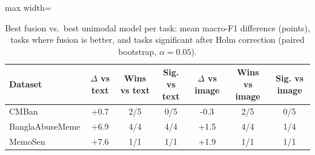 \begin{table}[t]
\centering
\small
\caption{Best fusion vs.\ best unimodal model per task: mean macro-F1 difference (points), tasks where fusion is better, and tasks significant after Holm correction (paired bootstrap, $\alpha=0.05$).}
\label{tab:cross_sig}
\begin{adjustbox}{max width=\columnwidth}
\begin{tabular}{lcccccc}
\toprule
Dataset & $\Delta$ vs text & Wins vs text & Sig. vs text & $\Delta$ vs image & Wins vs image & Sig. vs image \\
\midrule
CMBan & +0.7 & 2/5 & 0/5 & -0.3 & 2/5 & 0/5 \\
BanglaAbuseMeme & +6.9 & 4/4 & 4/4 & +1.5 & 4/4 & 1/4 \\
MemoSen & +7.6 & 1/1 & 1/1 & +1.9 & 1/1 & 1/1 \\
\bottomrule
\end{tabular}
\end{adjustbox}
\end{table}
